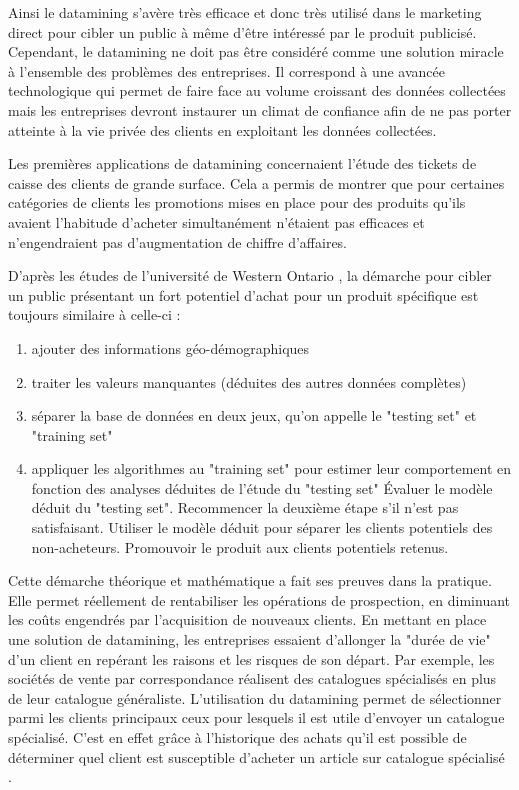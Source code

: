 Ainsi le datamining s'avère très efficace et donc très utilisé dans le marketing direct pour cibler un public à même d'être intéressé par le produit publicisé. Cependant, le datamining ne doit pas être considéré comme une solution miracle à l'ensemble des problèmes des entreprises. Il correspond à une avancée technologique qui permet de faire face au volume croissant des données collectées mais les entreprises devront instaurer un climat de confiance afin de ne pas porter atteinte à la vie privée des clients en exploitant les données collectées.

Les premières applications de datamining concernaient l'étude des tickets de caisse des clients de grande surface. Cela a permis de montrer que pour certaines catégories de clients les promotions mises en place pour des produits qu'ils avaient l'habitude d'acheter simultanément n'étaient pas efficaces et n'engendraient pas d'augmentation de chiffre d'affaires.

D'après les études de l'université de Western Ontario \cite{kdd98}, la démarche pour cibler un public présentant un fort potentiel d'achat pour un produit spécifique est toujours similaire à celle-ci :
\begin{enumerate}
  \li Récupérer les données de tous les clients possibles (retours des dernières prospections, informations personnelles sur des individus...)
  \li Dataminer à cette base de données, c'est-à-dire :
    \item ajouter des informations géo-démographiques
    \item traiter les valeurs manquantes (déduites des autres données complètes)
    \item séparer la base de données en deux jeux, qu'on appelle le "testing set" et "training set"
    \item appliquer les algorithmes au "training set" pour estimer leur comportement en fonction des analyses déduites de l'étude du "testing set"
    \li Évaluer le modèle déduit du "testing set". Recommencer la deuxième étape s'il n'est pas satisfaisant.
    \li Utiliser le modèle déduit pour séparer les clients potentiels des non-acheteurs.
    \li Promouvoir le produit aux clients potentiels retenus.
\end{enumerate}

Cette démarche théorique et mathématique a fait ses preuves dans la pratique. Elle permet réellement de rentabiliser les opérations de prospection, en diminuant les coûts engendrés par l'acquisition de nouveaux clients. En mettant en place une solution de datamining, les entreprises essaient d'allonger la "durée de vie" d'un client en repérant les raisons  et les risques de son départ. Par exemple, les sociétés de vente par correspondance réalisent des catalogues spécialisés en plus de leur catalogue généraliste. L'utilisation du datamining permet de sélectionner parmi les clients principaux ceux pour lesquels il est utile d'envoyer un catalogue spécialisé. C'est en effet grâce à l'historique des achats qu'il est possible de déterminer quel client est susceptible d'acheter un article sur catalogue spécialisé \cite{MM}.


